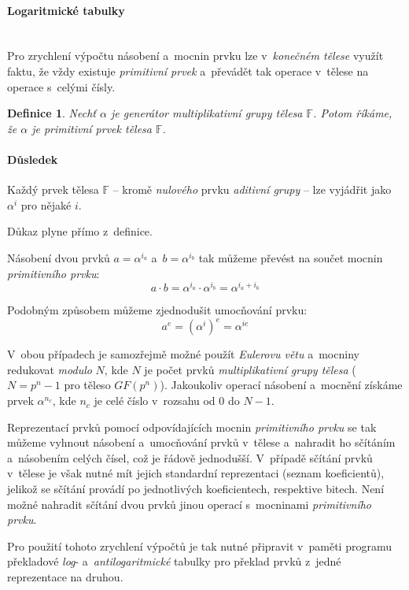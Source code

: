 \documentclass[thesis=M,czech,hidelinks]{FITthesis}[2012/06/26]
\newcommand{\0}{{\textcolor[gray]{0.75}{0}}}
\newtheorem{definice}{Definice}
\begin{document}
\paragraph{Logaritmické tabulky} \hfil \\
Pro zrychlení výpočtu násobení a~mocnin prvku lze v~\emph{konečném tělese}
využít faktu, že vždy existuje \emph{primitivní prvek} a~převádět tak operace
v~tělese na operace s~celými čísly.

\begin{definice}
    Nechť $\alpha$ je \emph{generátor} \emph{multiplikativní grupy} tělesa
    $\mathbb{F}$. Potom říkáme, že $\alpha$ je \emph{primitivní prvek} tělesa
    $\mathbb{F}$.
\end{definice}


\paragraph{Důsledek} Každý prvek tělesa $\mathbb{F}$ -- kromě \emph{nulového}
prvku \emph{aditivní grupy} -- lze vyjádřit jako $\alpha^i$ pro nějaké $i$.

Důkaz plyne přímo z~definice.

Násobení dvou prvků $a = \alpha^{i_a}$ a~$b = \alpha^{i_b}$ tak můžeme převést
na součet mocnin \emph{primitivního prvku}:
$$ a \cdot b = \alpha^{i_a} \cdot \alpha^{i_b} = \alpha^{i_a + i_b} $$

Podobným způsobem můžeme zjednodušit umocňování prvku:
$$ a^e = \left(\alpha^i\right)^e = \alpha^{i e} $$

V~obou případech je samozřejmě možné použít \emph{Eulerovu větu} a~mocniny
redukovat \emph{modulo} $N$, kde $N$ je počet prvků \emph{multiplikativní grupy
tělesa} ($N=p^n-1$ pro těleso $GF(p^n)$). Jakoukoliv operací násobení a~mocnění
získáme prvek $\alpha^{n_c}$, kde $n_c$ je celé číslo v~rozsahu od $0$ do $N-1$.

Reprezentací prvků pomocí odpovídajících mocnin \emph{primitivního prvku} se tak
můžeme vyhnout násobení a~umocňování prvků v~tělese a~nahradit ho sčítáním
a~násobením celých čísel, což je řádově jednodušší. V~případě sčítání prvků
v~tělese je však nutné mít jejich standardní reprezentaci (seznam koeficientů),
jelikož se sčítání provádí po jednotlivých koeficientech, respektive bitech.
Není možné nahradit sčítání dvou prvků jinou operací s~mocninami
\emph{primitivního prvku}.

Pro použití tohoto zrychlení výpočtů je tak nutné připravit v~paměti programu
překladové \emph{log}- a~\emph{antilogaritmické} tabulky pro překlad prvků
z~jedné reprezentace na druhou.
\end{document}
